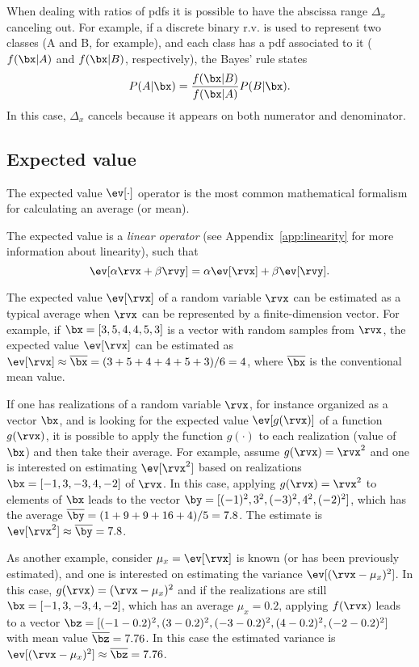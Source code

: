 When dealing with ratios of pdfs it is possible to have the abscissa range $\Delta_x$ canceling out. For example, if a discrete binary r.v. is used to represent two classes (A and B, for example), and each class has a pdf associated to it ($f(\bx|A)$ and $f(\bx|B)$, respectively), the Bayes' rule states
\begin{equation}
P(A|\bx)= \frac{f(\bx|B)}{f(\bx|A)} P(B|\bx).
\label{eq:generalBayesRule}
\end{equation}
In this case, $\Delta_x$ cancels because it appears on both numerator and denominator.

\subsection{Expected value}
\label{sec:expected_value}
The expected value $\ev[\cdot]$ operator is the most common mathematical formalism for calculating an average (or mean). 

The expected value is a \emph{linear operator} (see Appendix~\ref{app:linearity} for more information about linearity), such that
\begin{equation}
\ev[ \alpha \rvx + \beta \rvy] = \alpha\ev[  \rvx]  + \beta \ev[\rvy].
\label{eq:ev_linear_operator}
\end{equation}

The expected value $\ev[\rvx]$ of a random variable $\rvx$ can be estimated as a typical average
when $\rvx$ can be represented by a finite-dimension vector. 
For example, if $\bx=[3, 5, 4, 4, 5, 3]$ is a vector with random samples from $\rvx$, the expected value $\ev[\rvx]$ can be estimated as $\ev[\rvx] \approx \overline{\bx}=(3+5+4+4+5+3)/6=4$, where $\overline{\bx}$ is the conventional mean value.

If one has realizations of a random variable $\rvx$, for instance organized as a vector $\bx$, and is looking for the expected value $\ev[g(\rvx)]$ of a function $g(\rvx)$, it is possible to apply the function $g(\cdot)$ to each realization (value of $\bx$) and then take their average.
For example, assume $g(\rvx) = \rvx^2$ and one is interested on estimating $\ev[\rvx^2]$ based on realizations $\bx=[-1, 3, -3, 4, -2]$ of $\rvx$. In this case, applying $g(\rvx) = \rvx^2$ to elements of $\bx$ leads to the vector $\by = [(-1)^2, 3^2, (-3)^2, 4^2, (-2)^2]$, which has the average $\overline{\by} = (1 +    9   + 9   + 16    + 4)/5 = 7.8$. The estimate is $\ev[\rvx^2] \approx \overline{\by} = 7.8$. 

As another example, consider $\mu_x = \ev[\rvx]$ is known (or has been previously estimated), and one is interested 
on estimating the variance $\ev[(\rvx-\mu_x)^2]$. In this case, $g(\rvx) = (\rvx-\mu_x)^2$ and if the realizations are still $\bx=[-1, 3, -3, 4, -2]$, which has an average $\mu_x = 0.2$, applying $f(\rvx)$ leads to a vector $\bz=[(-1-0.2)^2, (3-0.2)^2, (-3-0.2)^2, (4-0.2)^2, (-2-0.2)^2]$ with mean value $\overline{\bz}=7.76$. In this case the estimated variance is $\ev[(\rvx-\mu_x)^2] \approx \overline{\bz} = 7.76$.

